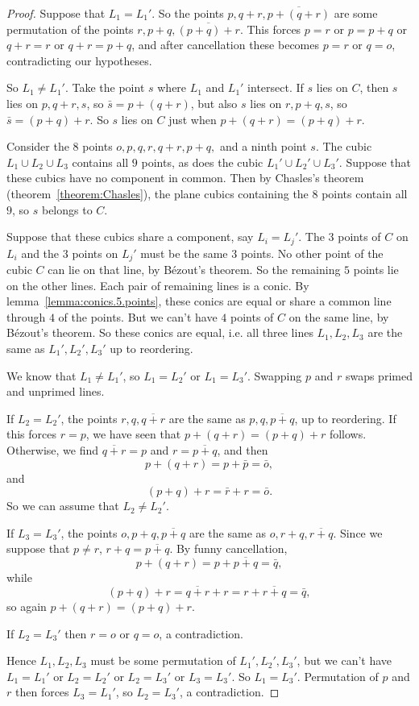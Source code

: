 \begin{proof}
Suppose that \(L_1 = L_1'\).
So the points \(p,q+r,\overline{p+(q+r)}\) are some permutation of the points \(r,p+q,\overline{(p+q)+r}\).
This forces \(p=r\) or \(p=p+q\) or \(q+r=r\) or \(q+r=p+q\), and after cancellation these becomes \(p=r\) or \(q=o\), contradicting our hypotheses.

So \(L_1 \ne L_1'\).
Take the point \(s\) where \(L_1\) and \(L_1'\) intersect.
If \(s\) lies on \(C\), then \(s\) lies on \(p,q+r,s\), so \(\bar{s}=p+(q+r)\), but also \(s\) lies on \(r,p+q,s\), so \(\bar{s}=(p+q)+r\).
So \(s\) lies on \(C\) just when \(p+(q+r)=(p+q)+r\).

Consider the \(8\) points \(o,p,q,r,q+r,p+q,\) and a ninth point \(s\).
The cubic \(L_1 \cup L_2 \cup L_3\) contains all \(9\) points, as does the cubic \(L_1' \cup L_2' \cup L_3'\).
Suppose that these cubics have no component in common.
Then by Chasles's theorem (theorem~\vref{theorem:Chasles}), the plane cubics containing the \(8\) points contain all \(9\), so \(s\) belongs to \(C\).

Suppose that these cubics share a component, say \(L_i = L_j'\).
The 3 points of \(C\) on \(L_i\) and the \(3\) points on \(L_j'\) must be the same \(3\) points.
No other point of the cubic \(C\) can lie on that line, by B\'ezout's theorem.
So the remaining \(5\) points lie on the other lines.
Each pair of remaining lines is a conic.
By lemma~\vref{lemma:conics.5.points}, these conics are equal or share a common line through \(4\) of the points.
But we can't have \(4\) points of \(C\) on the same line, by B\'ezout's theorem.
So these conics are equal, i.e. all three lines \(L_1,L_2,L_3\) are the same as \(L_1',L_2',L_3'\) up to reordering.

We know that \(L_1 \ne L_1'\), so \(L_1=L_2'\) or \(L_1=L_3'\).
Swapping \(p\) and \(r\) swaps primed and unprimed lines.

If \(L_2=L_2'\), the points \(r,q,\overline{q+r}\) are the same as \(p,q,\overline{p+q}\), up to reordering.
If this forces \(r=p\), we have seen that \(p+(q+r)=(p+q)+r\) follows.
Otherwise, we find \(\overline{q+r}=p\) and \(r=\overline{p+q}\), and then
\[
p+(q+r)=p+\bar{p}=\bar{o},
\]
and
\[
(p+q)+r=\bar{r}+r=\bar{o}.
\]
So we can assume that \(L_2 \ne L_2'\).

If \(L_3=L_3'\), the points \(o,p+q,\overline{p+q}\) are the same as \(o,r+q,\overline{r+q}\).
Since we suppose that \(p \ne r\), \(r+q=\overline{p+q}\).
By funny cancellation,
\[
p+(q+r)=p+\overline{p+q}=\bar{q},
\]
while
\[
(p+q)+r=\overline{q+r}+r=r+\overline{r+q}=\bar{q},
\]
so again \(p+(q+r)=(p+q)+r\).

If \(L_2=L_3'\) then \(r=o\) or \(q=o\), a contradiction.

Hence \(L_1, L_2, L_3\) must be some permutation of \(L_1',L_2',L_3'\), but we can't have \(L_1=L_1'\) or \(L_2=L_2'\) or \(L_2=L_3'\) or \(L_3=L_3'\).
So \(L_1=L_3'\).
Permutation of \(p\) and \(r\) then forces \(L_3=L_1'\), so \(L_2=L_3'\), a contradiction.
\end{proof}



